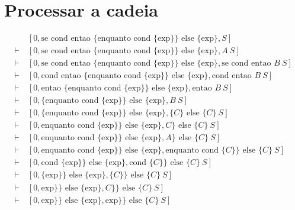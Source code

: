 \documentclass[ 12pt, a4paper]{article}
\begin{document}
\section{Processar a cadeia}
\begin{small}
\begin{align*}
    &[0, \text{se cond entao } \{ \text{enquanto cond } \{ \text{exp} \} \} \text{ else } \{ \text{exp} \}, S] \\
    \vdash\ &[0, \text{se cond entao } \{ \text{enquanto cond } \{ \text{exp} \} \} \text{ else } \{ \text{exp} \}, A\ S] \\
    \vdash\ &[0, \text{se cond entao } \{ \text{enquanto cond } \{ \text{exp} \} \} \text{ else } \{ \text{exp} \}, \text{se cond entao } B\ S] \\
    \vdash\ &[0, \text{cond entao } \{ \text{enquanto cond } \{ \text{exp} \} \} \text{ else } \{ \text{exp} \}, \text{cond entao } B\ S] \\
    \vdash\ &[0, \text{entao } \{ \text{enquanto cond } \{ \text{exp} \} \} \text{ else } \{ \text{exp} \}, \text{entao } B\ S] \\
    \vdash\ &[0, \{ \text{enquanto cond } \{ \text{exp} \} \} \text{ else } \{ \text{exp} \}, B\ S] \\
    \vdash\ &[0, \{ \text{enquanto cond } \{ \text{exp} \} \} \text{ else } \{ \text{exp} \}, \{ C \} \text{ else } \{ C \}\ S] \\
    \vdash\ &[0, \text{enquanto cond } \{ \text{exp} \} \} \text{ else } \{ \text{exp} \}, C \} \text{ else } \{ C \}\ S] \\
    \vdash\ &[0, \text{enquanto cond } \{ \text{exp} \} \} \text{ else } \{ \text{exp} \}, A \} \text{ else } \{ C \}\ S] \\
    \vdash\ &[0, \text{enquanto cond } \{ \text{exp} \} \} \text{ else } \{ \text{exp} \}, \text{enquanto cond } \{ C \} \} \text{ else } \{ C \}\ S] \\
    \vdash\ &[0, \text{cond } \{ \text{exp} \} \} \text{ else } \{ \text{exp} \}, \text{cond } \{ C \} \} \text{ else } \{ C \}\ S] \\
    \vdash\ &[0, \{ \text{exp} \} \} \text{ else } \{ \text{exp} \}, \{ C \} \} \text{ else } \{ C \}\ S] \\
    \vdash\ &[0, \text{exp} \} \} \text{ else } \{ \text{exp} \}, C \} \} \text{ else } \{ C \}\ S] \\
    \vdash\ &[0, \text{exp} \} \} \text{ else } \{ \text{exp} \}, \text{exp} \} \} \text{ else } \{ C \}\ S] \\

\end{align*}
\end{small}
\end{document}

